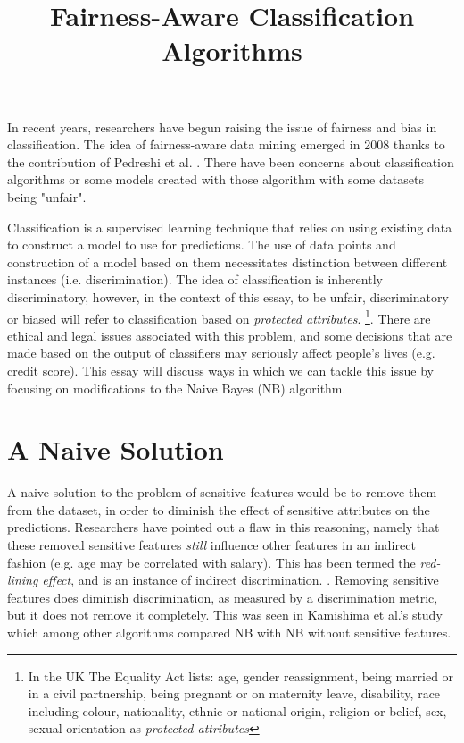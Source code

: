 \documentclass[a4paper, 12pt, notitlepage]{article}
\date{} %
\author{}
\title{Fairness-Aware Classification Algorithms}
\begin{document}
\maketitle

\vspace{-1.25cm}

In recent years, researchers have begun raising the issue of fairness and bias in classification. The idea of fairness-aware data mining emerged in 2008 thanks to the contribution of Pedreshi et al. \cite[p.~849]{kamishima2013} \cite{pedreshi2008}. There have been concerns about classification algorithms or some models created with those algorithm with some datasets being "unfair".

Classification is a supervised learning technique that relies on using existing data to construct a model to use for predictions. The use of data points and construction of a model based on them necessitates distinction between different instances (i.e. discrimination). The idea of classification is inherently discriminatory, however, in the context of this essay, to be unfair, discriminatory or biased will refer to classification based on \emph{protected attributes}. \footnote{In the UK The Equality Act lists: age, gender reassignment, being married or in a civil partnership, being pregnant or on maternity leave, disability, race including colour, nationality, ethnic or national origin, religion or belief, sex, sexual orientation as \emph{protected attributes}}. There are ethical and legal issues associated with this problem, and some decisions that are made based on the output of classifiers may seriously affect people's lives (e.g. credit score). This essay will discuss ways in which we can tackle this issue by focusing on modifications to the Naive Bayes (NB) algorithm.

\section*{A Naive Solution}

A naive solution to the problem of sensitive features would be to remove them from the dataset, in order to diminish the effect of sensitive attributes on the predictions. Researchers have pointed out a flaw in this reasoning, namely that these removed sensitive features \emph{still} influence other features in an indirect fashion (e.g. age may be correlated with salary). This has been termed the \emph{red-lining effect}, and is an instance of indirect discrimination.  \cite[p.~36]{kamishima2012b} \cite[p.~378]{kamishima2012a} \cite[p.~380]{kamishima2012a} \cite[p.~381]{kamishima2012a}. Removing sensitive features does diminish discrimination, as measured by a discrimination metric, but it does not remove it completely. This was seen in Kamishima et al.'s study which among other algorithms compared NB with NB without sensitive features. \cite[p.~855]{kamishima2013}
\end{document}

